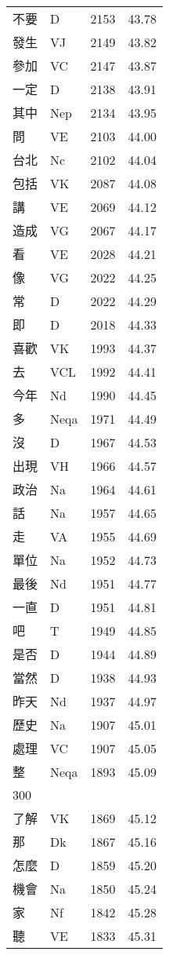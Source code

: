 \documentclass[twocolumn]{book}
\begin{document}
\begin{supertabular}{llrr}
不要 & D & 2153 &  43.78\\
發生 & VJ & 2149 &  43.82\\
參加 & VC & 2147 &  43.87\\
一定 & D & 2138 &  43.91\\
其中 & Nep & 2134 &  43.95\\
問 & VE & 2103 &  44.00\\
台北 & Nc & 2102 &  44.04\\
包括 & VK & 2087 &  44.08\\
講 & VE & 2069 &  44.12\\
造成 & VG & 2067 &  44.17\\
看 & VE & 2028 &  44.21\\
像 & VG & 2022 &  44.25\\
常 & D & 2022 &  44.29\\
即 & D & 2018 &  44.33\\
喜歡 & VK & 1993 &  44.37\\
去 & VCL & 1992 &  44.41\\
今年 & Nd & 1990 &  44.45\\
多 & Neqa & 1971 &  44.49\\
沒 & D & 1967 &  44.53\\
出現 & VH & 1966 &  44.57\\
政治 & Na & 1964 &  44.61\\
話 & Na & 1957 &  44.65\\
走 & VA & 1955 &  44.69\\
單位 & Na & 1952 &  44.73\\
最後 & Nd & 1951 &  44.77\\
一直 & D & 1951 &  44.81\\
吧 & T & 1949 &  44.85\\
是否 & D & 1944 &  44.89\\
當然 & D & 1938 &  44.93\\
昨天 & Nd & 1937 &  44.97\\
歷史 & Na & 1907 &  45.01\\
處理 & VC & 1907 &  45.05\\
整 & Neqa & 1893 &  45.09\\
300\\
了解 & VK & 1869 &  45.12\\
那 & Dk & 1867 &  45.16\\
怎麼 & D & 1859 &  45.20\\
機會 & Na & 1850 &  45.24\\
家 & Nf & 1842 &  45.28\\
聽 & VE & 1833 &  45.31\\

\end{supertabular}
\end{document}
